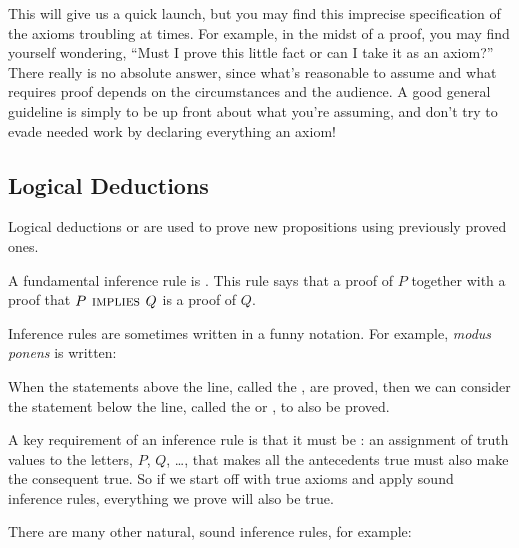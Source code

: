 This will give us a quick launch, but you may find this imprecise
specification of the axioms troubling at times.  For example, in the
midst of a proof, you may find yourself wondering, ``Must I prove this
little fact or can I take it as an axiom?''  There really is no
absolute answer, since what's reasonable to assume and what requires
proof depends on the circumstances and the audience.  A good general
guideline is simply to be up front about what you're assuming, and
don't try to evade needed work by declaring everything an axiom!

\subsection{Logical Deductions }\label{logical_deductions_subsec}

Logical deductions or  are used to prove new
propositions using previously proved ones.

A fundamental inference rule is .  This rule says that
a proof of $P$ together with a proof that $P \mathbin{\mathrm{\textsc{\,implies\,}}} Q$ is a proof of
$Q$.

Inference rules are sometimes written in a funny notation.  For example,
\emph{modus ponens} is written:
\begin{rul*}
\end{rul*}

When the statements above the line, called the , are
proved, then we can consider the statement below the line, called the
 or , to also be proved.

A key requirement of an inference rule is that it must be
: an assignment of truth values to the letters, $P$, $Q$,
\dots, that makes all the antecedents true must also make the
consequent true.  So if we start off with true axioms and apply sound
inference rules, everything we prove will also be true.

There are many other natural, sound inference rules, for example:
\begin{rul*}
\end{rul*}

\begin{editingnotes}

\begin{rul*}
\end{rul*}

\end{editingnotes}

